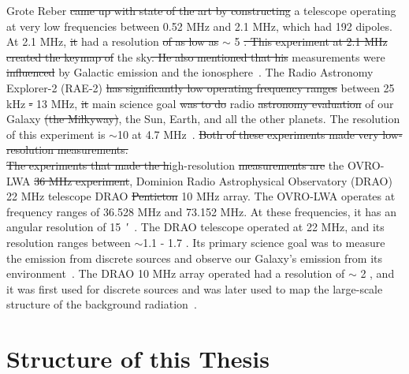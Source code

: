 	    Grote Reber \st{came up with state of the art by constructing}  a  telescope operating at very low frequencies between 0.52 MHz and 2.1 MHz, which had 192 dipoles. At 2.1 MHz, \st{it}  had a resolution \st{of as low as} $\sim$ 5 \degree \st{. This experiment at 2.1 MHz created the keymap of}  the sky\attention{,}\st{. He also mentioned that his}  measurements were \st{influenced}  by Galactic emission and the ionosphere~\citep{article, 1988A&A...195..372W}.  The Radio Astronomy Explorer-2 (RAE-2) \st{has significantly low operating frequency ranges}  between 25 kHz \st{-} 13 MHz, \st{it}  main science goal \st{was to do}  radio  \st{astronomy evaluation} of our Galaxy \st{(the Milkyway)}, the Sun, Earth, and all the other planets. The resolution of this experiment is $\sim$10 \degree at 4.7 MHz~\citep{1975A&A....40..365A}. \st{Both of these experiments made very low-resolution measurements.}  \\
	    
	    \st{The experiments that made the h}igh-resolution  \st{measurements are}  the OVRO-LWA \st{36 MHz experiment}, Dominion Radio Astrophysical Observatory (DRAO) 22 MHz telescope DRAO \st{Penticton} 10 MHz array. The OVRO-LWA operates at frequency ranges of 36.528 MHz and 73.152 MHz. At these frequencies, it has an angular resolution of \SI{15}{\arcminute}~\citep{2018AJ....156...32E}. The DRAO telescope operated at 22 MHz, and its resolution ranges between $\sim$1.1 \degree - 1.7 \degree. Its primary science goal was to measure the emission from discrete sources and observe our Galaxy's emission from its environment~\citep{1999A&AS..137....7R}. The DRAO 10 MHz array operated had a resolution of $\sim$ 2  \degree, and it was first used for discrete sources and was later used to map the large-scale structure of the background radiation~\citep{1976MNRAS.177..601C}.
	    
	    \section{Structure of this Thesis}
	    
